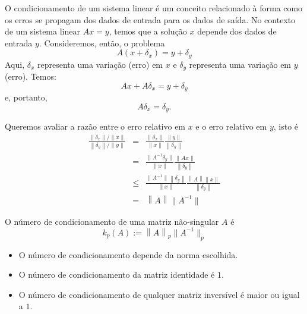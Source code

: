 O condicionamento de um sistema linear é um conceito relacionado à forma como os erros se propagam dos dados de entrada para os dados de saída. No contexto de um sistema linear $Ax=y$, temos que a solução $x$ depende dos dados de entrada $y$. Consideremos, então, o problema
\begin{equation}
  A(x+\delta_x)=y+\delta_y
\end{equation}
Aqui, $\delta_x$ representa uma variação (erro) em $x$ e $\delta_y$ representa uma variação em $y$ (erro). Temos:
\begin{equation}
  Ax+A\delta_x=y+\delta_y
\end{equation}
e, portanto,
\begin{equation}
  A\delta_x=\delta_y.
\end{equation}

Queremos avaliar a razão entre o erro relativo em $x$ e o erro relativo em $y$, isto é
\begin{eqnarray}
\frac{\left\|\delta_x\right\|/\left\|x\right\|}{\left\|\delta_y\right\|/\|y\|} &=& \frac{\left\|\delta_x\right\|}{\left\|x\right\|}\frac{\|y\|}{\left\|\delta_y\right\|}\\
&=& \frac{\|A^{-1}\delta_y\|}{\left\|x\right\|}\frac{\|Ax\|}{\left\|\delta_y\right\|} \\
&\leq& \frac{\|A^{-1}\|\left\|\delta_y\right\|}{\left\|x\right\|}\frac{\left\|A\right\|\left\|x\right\|}{\left\|\delta_y\right\|}\\
&=& \left\|A\right\|\|A^{-1}\|
\end{eqnarray}

\begin{defn} O número de condicionamento de uma matriz não-singular $A$ é
  \begin{equation}
    k_p(A) := \left\|A\right\|_p \|A^{-1}\|_p
  \end{equation}
\end{defn}

\begin{obs}
  \begin{itemize}
  \item O número de condicionamento depende da norma escolhida.
  \item O número de condicionamento da matriz identidade é $1$.
  \item O número de condicionamento de qualquer matriz inversível é maior ou igual a $1$.
  \end{itemize}
\end{obs}

